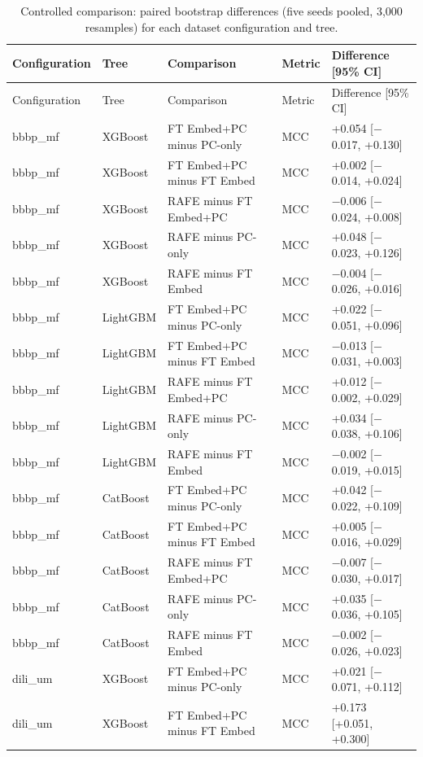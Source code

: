 \begin{longtable}{llllp{4.2cm}}
\caption{Controlled comparison: paired bootstrap differences (five seeds pooled, 3{,}000 resamples) for each dataset configuration and tree.}\label{tab:supp_paired}\\
\toprule
Configuration & Tree & Comparison & Metric & Difference [95\% CI] \\
\midrule
\endfirsthead
\toprule
Configuration & Tree & Comparison & Metric & Difference [95\% CI] \\
\midrule
\endhead
\bottomrule
\endfoot
bbbp\_mf & XGBoost & FT Embed+PC minus PC-only & MCC & +0.054 [$-$0.017, +0.130] \\
bbbp\_mf & XGBoost & FT Embed+PC minus FT Embed & MCC & +0.002 [$-$0.014, +0.024] \\
bbbp\_mf & XGBoost & RAFE minus FT Embed+PC & MCC & $-$0.006 [$-$0.024, +0.008] \\
bbbp\_mf & XGBoost & RAFE minus PC-only & MCC & +0.048 [$-$0.023, +0.126] \\
bbbp\_mf & XGBoost & RAFE minus FT Embed & MCC & $-$0.004 [$-$0.026, +0.016] \\
bbbp\_mf & LightGBM & FT Embed+PC minus PC-only & MCC & +0.022 [$-$0.051, +0.096] \\
bbbp\_mf & LightGBM & FT Embed+PC minus FT Embed & MCC & $-$0.013 [$-$0.031, +0.003] \\
bbbp\_mf & LightGBM & RAFE minus FT Embed+PC & MCC & +0.012 [$-$0.002, +0.029] \\
bbbp\_mf & LightGBM & RAFE minus PC-only & MCC & +0.034 [$-$0.038, +0.106] \\
bbbp\_mf & LightGBM & RAFE minus FT Embed & MCC & $-$0.002 [$-$0.019, +0.015] \\
bbbp\_mf & CatBoost & FT Embed+PC minus PC-only & MCC & +0.042 [$-$0.022, +0.109] \\
bbbp\_mf & CatBoost & FT Embed+PC minus FT Embed & MCC & +0.005 [$-$0.016, +0.029] \\
bbbp\_mf & CatBoost & RAFE minus FT Embed+PC & MCC & $-$0.007 [$-$0.030, +0.017] \\
bbbp\_mf & CatBoost & RAFE minus PC-only & MCC & +0.035 [$-$0.036, +0.105] \\
bbbp\_mf & CatBoost & RAFE minus FT Embed & MCC & $-$0.002 [$-$0.026, +0.023] \\
dili\_um & XGBoost & FT Embed+PC minus PC-only & MCC & +0.021 [$-$0.071, +0.112] \\
dili\_um & XGBoost & FT Embed+PC minus FT Embed & MCC & +0.173 [+0.051, +0.300] \\

\end{longtable}
